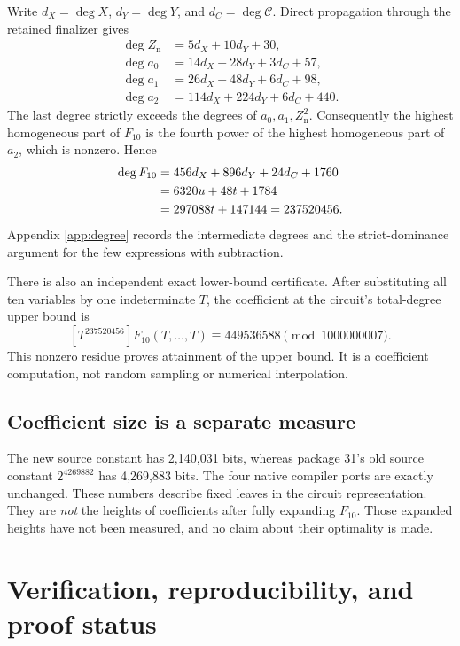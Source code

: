 \documentclass[11pt]{article}
\newcommand{\capC}{\mathscr C}
\theoremstyle{definition}
\theoremstyle{remark}
\numberwithin{equation}{section}
\begin{document}
Write \(d_X=\deg X\), \(d_Y=\deg Y\), and \(d_C=\deg\capC\).
Direct propagation through the retained finalizer gives
\begin{align*}
 \deg Z_{\mathrm n}&=5d_X+10d_Y+30,\\
 \deg a_0&=14d_X+28d_Y+3d_C+57,\\
 \deg a_1&=26d_X+48d_Y+6d_C+98,\\
 \deg a_2&=114d_X+224d_Y+6d_C+440.
\end{align*}
The last degree strictly exceeds the degrees of \(a_0,a_1,Z_{\mathrm n}^2\).
Consequently the highest homogeneous part of \(F_{10}\) is the fourth
power of the highest homogeneous part of \(a_2\), which is nonzero.
Hence
\begin{align}
 \deg F_{10}
 &=456d_X+896d_Y+24d_C+1760 \notag\\
 &=6320u+48t+1784 \notag\\
 &=297088t+147144
 =237520456. \label{eq:degree}
\end{align}
Appendix \ref{app:degree} records the intermediate degrees and the
strict-dominance argument for the few expressions with subtraction.

There is also an independent exact lower-bound certificate. After
substituting all ten variables by one indeterminate \(T\), the
coefficient at the circuit's total-degree upper bound is
\[
 [T^{237520456}]F_{10}(T,\ldots,T)
 \equiv449536588\pmod{1000000007}.
\]
This nonzero residue proves attainment of the upper bound. It is a
coefficient computation, not random sampling or numerical interpolation.

\subsection{Coefficient size is a separate measure}

The new source constant has 2,140,031 bits, whereas package 31's old
source constant \(2^{4269882}\) has 4,269,883 bits.
The four native compiler ports are exactly unchanged. These numbers
describe fixed leaves in the circuit representation. They are
\emph{not} the heights of coefficients after fully expanding \(F_{10}\).
Those expanded heights have not been measured, and no claim about their
optimality is made.

\section{Verification, reproducibility, and proof status}
\label{sec:verification}
\end{document}
